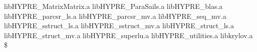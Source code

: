 \begin{ttfamily}
\begin{mdseries}
libHYPRE\_MatrixMatrix.a\linebreak
libHYPRE\_ParaSails.a\linebreak
libHYPRE\_blas.a\linebreak
libHYPRE\_parcsr\_ls.a\linebreak
libHYPRE\_parcsr\_mv.a\linebreak
libHYPRE\_seq\_mv.a\linebreak
libHYPRE\_sstruct\_ls.a\linebreak
libHYPRE\_sstruct\_mv.a\linebreak
libHYPRE\_struct\_ls.a\linebreak
libHYPRE\_struct\_mv.a\linebreak
libHYPRE\_superlu.a\linebreak
libHYPRE\_utilities.a\linebreak
libkrylov.a\linebreak
\$ \linebreak
\end{mdseries}
\end{ttfamily}
